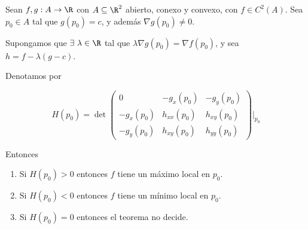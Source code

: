 \begin{teo}
    Sean $f,g: A \rightarrow \R$ con $A \subseteq \R^2$ abierto, conexo y convexo, con $f \in C^2(A)$. Sea $p_0 \in A$ tal que $g(p_0) = c$, y además $\nabla g(p_0) \neq 0$.
    
    Supongamos que $\exists~\lambda \in \R$ tal que $\lambda \nabla g(p_0) = \nabla f(p_0)$, y sea $h = f - \lambda(g-c)$.
    
    Denotamos por
    
    \[
    H(p_0) = \det \begin{pmatrix}
                      0         & -g_x(p_0)   & -g_y(p_0)   \\
                      -g_x(p_0) & h_{xx}(p_0) & h_{xy}(p_0) \\
                      -g_y(p_0) & h_{xy}(p_0) & h_{yy}(p_0)
                  \end{pmatrix}
                  \Biggr\rvert_{p_0}
    \]
    
    Entonces
    
    \begin{enumerate}
        \item Si $H(p_0) > 0$ entonces $f$ tiene un máximo local en $p_0$.
        \item Si $H(p_0) < 0$ entonces $f$ tiene un mínimo local en $p_0$.
        \item Si $H(p_0) = 0$ entonces el teorema no decide.
    \end{enumerate}
\end{teo}